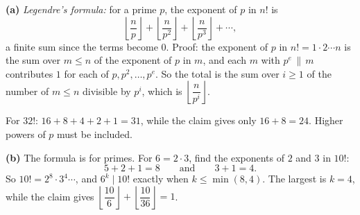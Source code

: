 \textbf{(a)} \emph{Legendre's formula:} for a prime $p$, the exponent of $p$ in $n!$ is
\[\left\lfloor\dfrac np\right\rfloor+\left\lfloor\dfrac n{p^2}\right\rfloor+\left\lfloor\dfrac n{p^3}\right\rfloor+\cdots,\]
a finite sum since the terms become $0$. Proof: the exponent of $p$ in $n!=1\cdot2\cdots n$ is the sum over $m\le n$ of the exponent of $p$ in $m$, and each $m$ with $p^e\,\|\,m$ contributes $1$ for each of $p,p^2,\dots,p^e$. So the total is the sum over $i\ge1$ of the number of $m\le n$ divisible by $p^i$, which is $\left\lfloor\dfrac n{p^i}\right\rfloor$.

For $32!$: $16+8+4+2+1=\boxed{31}$, while the claim gives only $16+8=24$. Higher powers of $p$ must be included.

\textbf{(b)} The formula is for primes. For $6=2\cdot3$, find the exponents of $2$ and $3$ in $10!$:
\[5+2+1=8\qquad\text{and}\qquad3+1=4.\]
So $10!=2^8\cdot3^4\cdots$, and $6^k\mid10!$ exactly when $k\le\min(8,4)$. The largest is $k=\boxed{4}$, while the claim gives $\left\lfloor\dfrac{10}6\right\rfloor+\left\lfloor\dfrac{10}{36}\right\rfloor=1$.
